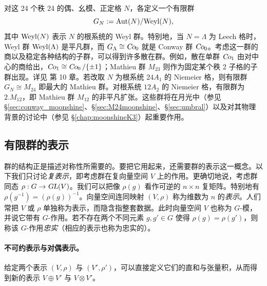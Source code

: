 \documentclass[11pt,a4paper,fontset=windows]{ctexart}
\numberwithin{equation}{section}
\newcommand{\GL}{\operatorname{\textsl{GL}}}      %
\newcommand{\Co}{\operatorname{\textsl{Co}}}      %
\newcommand{\Aut}{\operatorname{\text{Aut}}}      %
\newcommand{\myparagraph}[1]{\paragraph{#1}\mbox\\}
\def\r{\rho}
\def\rr{\rho}
\newcommand{\be}{\begin{equation}}
\newcommand{\ee}{\end{equation}}
\begin{document}

对这 24 个秩 24 的偶、幺模、正定格 $N$，各定义一个有限群
\be\label{def:niemeier_grp}
G_{N} := {\rm Aut}(N)/{\rm Weyl } (N), 
\ee
其中 ${\rm Weyl } (N)$ 表示 $N$ 的根系统的 Weyl 群。特别地，当 $N=\Lambda$ 为 Leech 格时，Weyl 群 ${\rm Weyl } (\Lambda)$ 是平凡群，而 $G_{\Lambda} \cong \Co_0$ 就是 Conway 群 $\Co_0$。考虑这一群的商以及稳定各种结构的子群，可以得到许多散在群。例如，散在单群 $\Co_1$ 由对中心的商给出，$\Co_1\cong \Co_0/\{\pm1\}$；Mathieu 群 $M_{23}$ 则作为固定某个秩 2 子格的子群出现。详见 \cite{sphere_packing} 第 10 章。若改取 $N$ 为根系统 $24A_1$ 的 Niemeier 格，则有限群 $G_{N}\cong M_{24}$ 即最大的 Mathieu 群。对根系统 $12A_2$ 的 Niemeier 格，有限群为 $2.M_{12}$，即 Mathieu 群 $M_{12}$ 的非平凡扩张。这些群将在月光中（参见 \S\ref{sec:conway_moonshine}、\S\ref{sec:M24moonshine}、\S\ref{sec:umbral}）以及对其物理背景的讨论中（参见 \S\ref{chap:moonshineK3}）起重要作用。


\subsection{有限群的表示}
\label{subsec:rep}

群的结构正是描述对称性所需要的。要把它用起来，还需要群的表示这一概念。以下我们只讨论\emph{复表示}，即考虑群在复向量空间 $V$ 上的作用。更确切地说，考虑群同态 $\r:G\rightarrow\GL(V)$。我们可以把像 $\r(g)$ 看作可逆的 $n\times n$ 复矩阵。特别地有 $\rr\left(g^{-1}\right)=(\rr(g))^{-1}$。向量空间连同映射 $(V,\rr)$ 称为维数为 $n$ 的\emph{表示}。人们常把 $V$ 或 $\rr$ 单独称为表示，而隐含指整套数据。此时向量空间 $V$ 也称为 $G$-模，并说它带有 $G$-作用。若不存在两个不同元素 $g,g'\in G$ 使得 $\rho(g)=\rho(g')$，则称该 $G$-作用\emph{忠实}（相应的表示也称为忠实的）。

\myparagraph{不可约表示与对偶表示。}
给定两个表示 $(V,\rr)$ 与 $(V',\rr')$，可以直接定义它们的直和与张量积，从而得到新的表示 $V\oplus V'$ 与 $V\otimes V'$。
\end{document}
